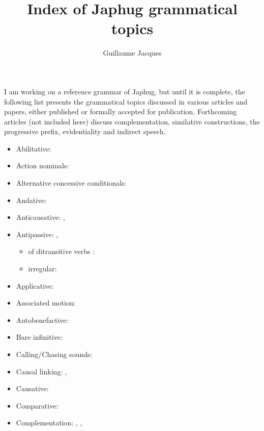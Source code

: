 \documentclass[oldfontcommands,oneside,a4paper,11pt]{article}
\begin{document}
 
\title{Index of Japhug grammatical topics}
\author{Guillaume Jacques}
\maketitle

I am working on a reference grammar of Japhug, but until it is complete, the following list presents the grammatical topics discussed in various articles and papers, either published or formally accepted for publication. Forthcoming articles (not included here) discuss complementation, similative constructions, the progressive prefix, evidentiality and indirect speech.

\begin{itemize}
\item Abilitative: \citet{jacques15causative}
\item Action nominals: \citet[7]{jacques14antipassive}
\item Alternative concessive conditionals: \citet[298]{jacques14linking}
\item Andative: \citet[200-6]{jacques13harmonization}
\item Anticausative: \citet[213-4]{jacques12demotion}, \citet{jacques15spontaneous}
\item Antipassive: \citet[215-6]{jacques12demotion}, \citet{jacques14antipassive}
\begin{itemize}
\item of ditransitive verbs : \citet[13-4]{jacques14antipassive}
\item irregular:  \citet[18-20]{jacques14antipassive}
\end{itemize}
\item Applicative: \citet{jacques13tropative}
\item Associated motion: \citet[200-6]{jacques13harmonization}
\item Autobenefactive: \citet{jacques15spontaneous}
\item Bare infinitive: \citet[9]{jacques14antipassive}
\item Calling/Chasing sounds:   \citet[283-4]{japhug14ideophones}
\item Causal linking:  \citet[303-6]{jacques14linking}, \citet{jacques16comparative}
\item Causative: \citet{jacques15causative}
\item Comparative: \citet{jacques16comparative}
\item Complementation: \citet{jacques08}, , \citet{jacques16sketch}
\begin{itemize}

\end{itemize}
\end{itemize}
\end{document}

